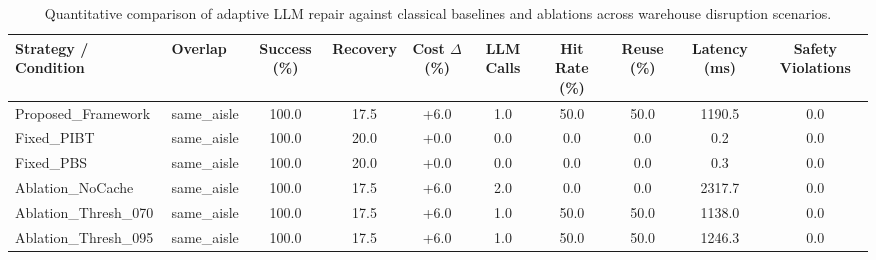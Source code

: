 \begin{table}[t]
\centering
\small
\caption{Quantitative comparison of adaptive LLM repair against classical baselines and ablations across warehouse disruption scenarios.}
\label{tab:mapf_benchmark_results}
\begin{tabular}{llcccccccc}
\hline
\textbf{Strategy / Condition} & \textbf{Overlap} & \textbf{Success (\%)} & \textbf{Recovery} & \textbf{Cost $\Delta$ (\%)} & \textbf{LLM Calls} & \textbf{Hit Rate (\%)} & \textbf{Reuse (\%)} & \textbf{Latency (ms)} & \textbf{Safety Violations} \\
\hline
Proposed\_Framework & same_aisle & 100.0 & 17.5 & +6.0 & 1.0 & 50.0 & 50.0 & 1190.5 & 0.0 \\
Fixed\_PIBT & same_aisle & 100.0 & 20.0 & +0.0 & 0.0 & 0.0 & 0.0 & 0.2 & 0.0 \\
Fixed\_PBS & same_aisle & 100.0 & 20.0 & +0.0 & 0.0 & 0.0 & 0.0 & 0.3 & 0.0 \\
Ablation\_NoCache & same_aisle & 100.0 & 17.5 & +6.0 & 2.0 & 0.0 & 0.0 & 2317.7 & 0.0 \\
Ablation\_Thresh\_070 & same_aisle & 100.0 & 17.5 & +6.0 & 1.0 & 50.0 & 50.0 & 1138.0 & 0.0 \\
Ablation\_Thresh\_095 & same_aisle & 100.0 & 17.5 & +6.0 & 1.0 & 50.0 & 50.0 & 1246.3 & 0.0 \\
\hline
\end{tabular}
\end{table}
